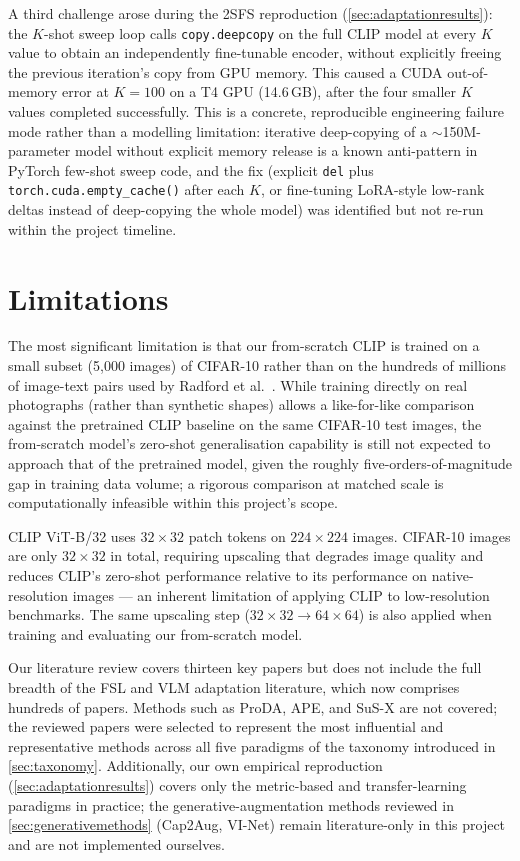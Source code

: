 \documentclass{iutbscthesis}
\begin{document}
A third challenge arose during the 2SFS reproduction (\autoref{sec:adaptationresults}): the $K$-shot sweep loop calls \texttt{copy.deepcopy} on the full CLIP model at every $K$ value to obtain an independently fine-tunable encoder, without explicitly freeing the previous iteration's copy from GPU memory. This caused a CUDA out-of-memory error at $K=100$ on a T4 GPU (14.6\,GB), after the four smaller $K$ values completed successfully. This is a concrete, reproducible engineering failure mode rather than a modelling limitation: iterative deep-copying of a $\sim$150M-parameter model without explicit memory release is a known anti-pattern in PyTorch few-shot sweep code, and the fix (explicit \texttt{del} plus \texttt{torch.cuda.empty\_cache()} after each $K$, or fine-tuning LoRA-style low-rank deltas instead of deep-copying the whole model) was identified but not re-run within the project timeline.

\section{Limitations}

The most significant limitation is that our from-scratch CLIP is trained on a small subset (5{,}000 images) of CIFAR-10 rather than on the hundreds of millions of image-text pairs used by Radford et al.\ \cite{radford2021clip}. While training directly on real photographs (rather than synthetic shapes) allows a like-for-like comparison against the pretrained CLIP baseline on the same CIFAR-10 test images, the from-scratch model's zero-shot generalisation capability is still not expected to approach that of the pretrained model, given the roughly five-orders-of-magnitude gap in training data volume; a rigorous comparison at matched scale is computationally infeasible within this project's scope.

CLIP ViT-B/32 uses $32\times32$ patch tokens on $224\times224$ images. CIFAR-10 images are only $32\times32$ in total, requiring upscaling that degrades image quality and reduces CLIP's zero-shot performance relative to its performance on native-resolution images --- an inherent limitation of applying CLIP to low-resolution benchmarks. The same upscaling step ($32\times32 \to 64\times64$) is also applied when training and evaluating our from-scratch model.

Our literature review covers thirteen key papers but does not include the full breadth of the FSL and VLM adaptation literature, which now comprises hundreds of papers. Methods such as ProDA, APE, and SuS-X are not covered; the reviewed papers were selected to represent the most influential and representative methods across all five paradigms of the taxonomy introduced in \autoref{sec:taxonomy}. Additionally, our own empirical reproduction (\autoref{sec:adaptationresults}) covers only the metric-based and transfer-learning paradigms in practice; the generative-augmentation methods reviewed in \autoref{sec:generativemethods} (Cap2Aug, VI-Net) remain literature-only in this project and are not implemented ourselves.
\end{document}
